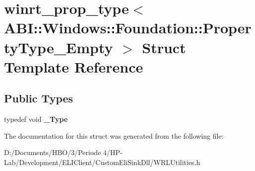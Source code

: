 \hypertarget{structwinrt__prop__type_3_01_a_b_i_1_1_windows_1_1_foundation_1_1_property_type___empty_01_4}{}\section{winrt\+\_\+prop\+\_\+type$<$ A\+BI\+:\+:Windows\+:\+:Foundation\+:\+:Property\+Type\+\_\+\+Empty $>$ Struct Template Reference}
\label{structwinrt__prop__type_3_01_a_b_i_1_1_windows_1_1_foundation_1_1_property_type___empty_01_4}
\subsection*{Public Types}
\begin{DoxyCompactItemize}
\item 
\mbox{\label{structwinrt__prop__type_3_01_a_b_i_1_1_windows_1_1_foundation_1_1_property_type___empty_01_4_ade551244a58f074eabc019e4c6d15b71}} 
typedef void {\bfseries \+\_\+\+Type}
\end{DoxyCompactItemize}


The documentation for this struct was generated from the following file\+:\begin{DoxyCompactItemize}
\item 
D\+:/\+Documents/\+H\+B\+O/3/\+Periode 4/\+H\+P-\/\+Lab/\+Development/\+E\+L\+I\+Client/\+Custom\+Eli\+Sink\+Dll/W\+R\+L\+Utilities.\+h\end{DoxyCompactItemize}
